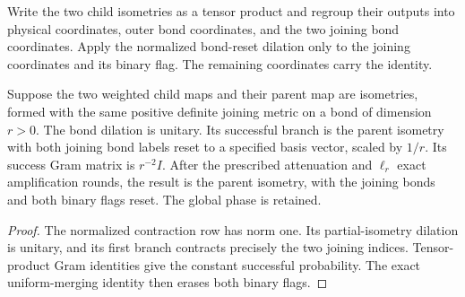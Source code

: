 \begin{definition}
    \label{def:mpu_balanced_interval_dilation}
    \leanok
    Write the two child isometries as a tensor product and regroup
    their outputs into physical coordinates, outer bond coordinates,
    and the two joining bond coordinates. Apply the normalized
    bond-reset dilation only to the joining coordinates and its
    binary flag. The remaining coordinates carry the identity.
\end{definition}

\begin{lemma}
    \label{thm:mpu_balanced_interval_dilation}
    \leanok
    Suppose the two weighted child maps and their parent map are
    isometries, formed with the same positive definite joining metric
    on a bond of dimension $r>0$. The bond dilation is unitary.
    Its successful branch is the parent isometry with both joining
    bond labels reset to a specified basis vector, scaled by $1/r$.
    Its success Gram matrix is $r^{-2}I$. After the prescribed
    attenuation and $\ell_r$ exact amplification rounds, the result
    is the parent isometry, with the joining bonds and both binary
    flags reset. The global phase is retained.
\end{lemma}
\begin{proof}\leanok
    The normalized contraction row has norm one. Its partial-isometry
    dilation is unitary, and its first branch contracts precisely
    the two joining indices. Tensor-product Gram identities give
    the constant successful probability. The exact uniform-merging
    identity then erases both binary flags.
\end{proof}

